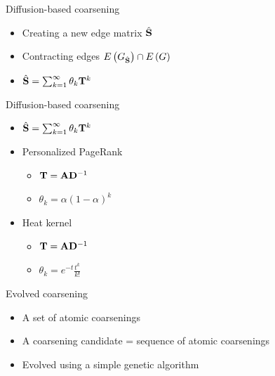\documentclass[10pt, aspectratio=169]{beamer}
\newcommand{\mathmat}{\ensuremath{\mathbf}}
\begin{document}
\begin{frame}{Diffusion-based coarsening}
	\begin{itemize}
		\item Creating a new edge matrix \( \hat{\mathmat{S}} \)
		\item Contracting edges \( E \left( G_{\hat{\mathmat{S}}} \right) \cap E \left( G \right) \)
		\item \( \hat{\mathmat{S}} = \sum_{k = 1}^\infty \theta_k \mathmat{T}^k \)
	\end{itemize}
\end{frame}

\begin{frame}{Diffusion-based coarsening}
	\begin{itemize}
		\item \( \hat{\mathmat{S}} = \sum_{k = 1}^\infty \theta_k \mathmat{T}^k \)
		\item Personalized PageRank
		\begin{itemize}
			\item \( \mathmat{T} = \mathmat{A} \mathmat{D}^{-1} \)
			\item \( \theta_k = \alpha \left( 1 - \alpha \right)^k \)
		\end{itemize}
		\item Heat kernel
		\begin{itemize}
			\item \( \mathmat{T} = \mathmat{A} \mathmat{D}^{-1} \)
			\item \( \theta_k = e^{-t} \frac{t^k}{k!} \)
		\end{itemize}
	\end{itemize}
\end{frame}

\begin{frame}{Evolved coarsening}
	\begin{itemize}
		\item A set of atomic coarsenings
		\item A coarsening candidate = sequence of atomic coarsenings
		\item Evolved using a simple genetic algorithm
	\end{itemize}
\end{frame}
\end{document}
